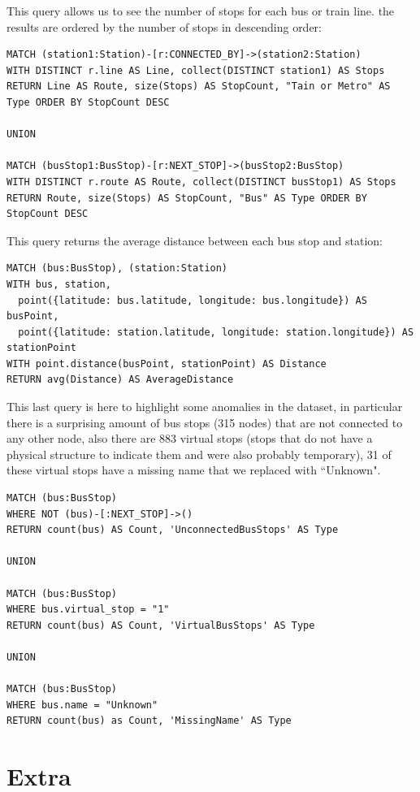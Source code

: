 \documentclass{Configuration_Files/PoliMi3i_thesis}
\begin{document}
This query allows us to see the number of stops for each bus or train line. the results are ordered by the number of stops in descending order:
\begin{lstlisting}[language=Cypher]
MATCH (station1:Station)-[r:CONNECTED_BY]->(station2:Station)
WITH DISTINCT r.line AS Line, collect(DISTINCT station1) AS Stops
RETURN Line AS Route, size(Stops) AS StopCount, "Tain or Metro" AS Type ORDER BY StopCount DESC

UNION

MATCH (busStop1:BusStop)-[r:NEXT_STOP]->(busStop2:BusStop)
WITH DISTINCT r.route AS Route, collect(DISTINCT busStop1) AS Stops
RETURN Route, size(Stops) AS StopCount, "Bus" AS Type ORDER BY StopCount DESC
\end{lstlisting}

This query returns the average distance between each bus stop and station:

\begin{lstlisting}[language=Cypher]
MATCH (bus:BusStop), (station:Station)
WITH bus, station,
  point({latitude: bus.latitude, longitude: bus.longitude}) AS busPoint,
  point({latitude: station.latitude, longitude: station.longitude}) AS stationPoint
WITH point.distance(busPoint, stationPoint) AS Distance
RETURN avg(Distance) AS AverageDistance
\end{lstlisting}

This last query is here to highlight some anomalies in the dataset, in particular there is a surprising amount of bus stops (315 nodes) that are not connected to any other node, also there are 883 virtual stops (stops that do not have a physical structure to indicate them and were also probably temporary), 31 of these virtual stops have a missing name that we replaced with ``Unknown".

\begin{lstlisting}[language=Cypher]
MATCH (bus:BusStop)
WHERE NOT (bus)-[:NEXT_STOP]->()
RETURN count(bus) AS Count, 'UnconnectedBusStops' AS Type

UNION

MATCH (bus:BusStop)
WHERE bus.virtual_stop = "1"
RETURN count(bus) AS Count, 'VirtualBusStops' AS Type

UNION

MATCH (bus:BusStop)
WHERE bus.name = "Unknown"
RETURN count(bus) as Count, 'MissingName' AS Type
\end{lstlisting}

\chapter{Extra}
\end{document}
